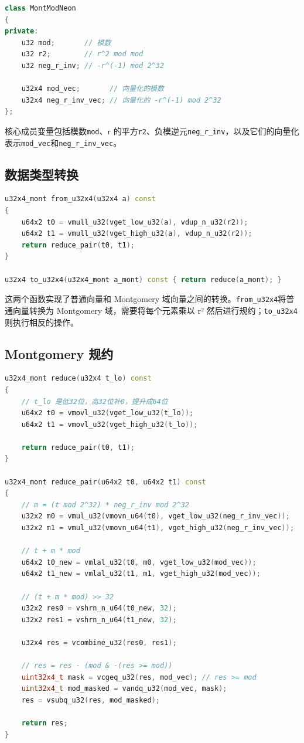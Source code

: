 \documentclass[a4paper]{article}
\begin{document}
\begin{lstlisting}[language=C++]
class MontModNeon
{
private:
    u32 mod;       // 模数
    u32 r2;        // r^2 mod mod
    u32 neg_r_inv; // -r^(-1) mod 2^32

    u32x4 mod_vec;       // 向量化的模数
    u32x4 neg_r_inv_vec; // 向量化的 -r^(-1) mod 2^32
};
\end{lstlisting}

核心成员变量包括模数\texttt{mod}、r 的平方\texttt{r2}、负模逆元\texttt{neg\_r\_inv}，以及它们的向量化表示\texttt{mod\_vec}和\texttt{neg\_r\_inv\_vec}。

\subsection{数据类型转换}

\begin{lstlisting}[language=C++]
u32x4_mont from_u32x4(u32x4 a) const
{
    u64x2 t0 = vmull_u32(vget_low_u32(a), vdup_n_u32(r2));
    u64x2 t1 = vmull_u32(vget_high_u32(a), vdup_n_u32(r2));
    return reduce_pair(t0, t1);
}

u32x4 to_u32x4(u32x4_mont a_mont) const { return reduce(a_mont); }
\end{lstlisting}

这两个函数实现了普通向量和 Montgomery 域向量之间的转换。\texttt{from\_u32x4}将普通向量转换为 Montgomery 域，需要将每个元素乘以 r² 然后进行规约；\texttt{to\_u32x4}则执行相反的操作。

\subsection{Montgomery 规约}

\begin{lstlisting}[language=C++]
u32x4_mont reduce(u32x4 t_lo) const
{
    // t_lo 是低32位，高32位补0，提升成64位
    u64x2 t0 = vmovl_u32(vget_low_u32(t_lo));
    u64x2 t1 = vmovl_u32(vget_high_u32(t_lo));

    return reduce_pair(t0, t1);
}

u32x4_mont reduce_pair(u64x2 t0, u64x2 t1) const
{
    // m = (t mod 2^32) * neg_r_inv mod 2^32
    u32x2 m0 = vmul_u32(vmovn_u64(t0), vget_low_u32(neg_r_inv_vec));
    u32x2 m1 = vmul_u32(vmovn_u64(t1), vget_high_u32(neg_r_inv_vec));

    // t + m * mod
    u64x2 t0_new = vmlal_u32(t0, m0, vget_low_u32(mod_vec));
    u64x2 t1_new = vmlal_u32(t1, m1, vget_high_u32(mod_vec));

    // (t + m * mod) >> 32
    u32x2 res0 = vshrn_n_u64(t0_new, 32);
    u32x2 res1 = vshrn_n_u64(t1_new, 32);

    u32x4 res = vcombine_u32(res0, res1);

    // res = res - (mod & -(res >= mod))
    uint32x4_t mask = vcgeq_u32(res, mod_vec); // res >= mod
    uint32x4_t mod_masked = vandq_u32(mod_vec, mask);
    res = vsubq_u32(res, mod_masked);

    return res;
}
\end{lstlisting}
\end{document}
